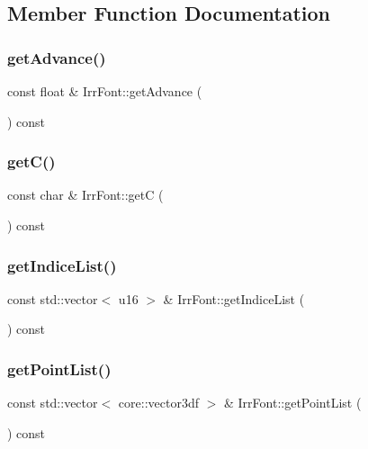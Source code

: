 \subsection{Member Function Documentation}
\mbox{\label{class_irr_font_aace44039b7890675a4bf0fce831132cb}} 
\subsubsection{\texorpdfstring{getAdvance()}{getAdvance()}}
{\footnotesize\ttfamily const float \& Irr\+Font\+::get\+Advance (\begin{DoxyParamCaption}{ }\end{DoxyParamCaption}) const}

\mbox{\label{class_irr_font_a59e72c80a686bf8bb3935ac5b45a70db}} 
\subsubsection{\texorpdfstring{getC()}{getC()}}
{\footnotesize\ttfamily const char \& Irr\+Font\+::getC (\begin{DoxyParamCaption}{ }\end{DoxyParamCaption}) const}

\mbox{\label{class_irr_font_a8664e942750c1d7d1515d77cebc8ad57}} 
\subsubsection{\texorpdfstring{getIndiceList()}{getIndiceList()}}
{\footnotesize\ttfamily const std\+::vector$<$ u16 $>$ \& Irr\+Font\+::get\+Indice\+List (\begin{DoxyParamCaption}{ }\end{DoxyParamCaption}) const}

\mbox{\label{class_irr_font_aa061c6d64afeaf59a2b2b6396e1ca708}} 
\subsubsection{\texorpdfstring{getPointList()}{getPointList()}}
{\footnotesize\ttfamily const std\+::vector$<$ core\+::vector3df $>$ \& Irr\+Font\+::get\+Point\+List (\begin{DoxyParamCaption}{ }\end{DoxyParamCaption}) const}

